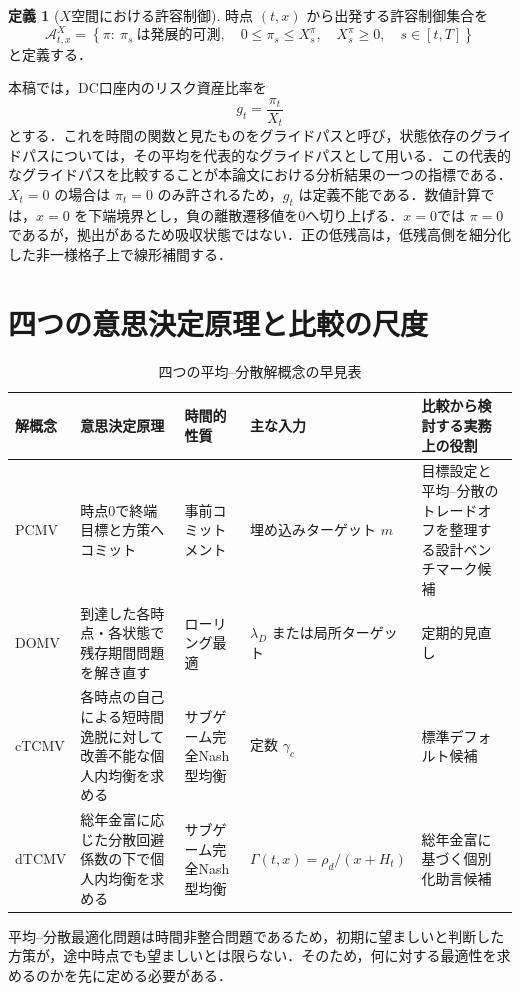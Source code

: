 \documentclass[10pt,a4paper]{article}
\theoremstyle{plain}
\theoremstyle{definition}
\newtheorem{definition}{定義}
\newcommand{\A}{\mathcal{A}}
\begin{document}
\begin{definition}[$X$空間における許容制御]
時点 $(t,x)$ から出発する許容制御集合を
\begin{equation}
  \A^X_{t,x}
  =
  \left\{
  \pi:\ \pi_s\ \text{は発展的可測},\quad
  0\leq\pi_s\leq X_s^\pi,\quad X_s^\pi\geq0,\quad s\in[t,T]
  \right\}
  \label{eq:admissible-X}
\end{equation}
と定義する．
\end{definition}

本稿では，DC口座内のリスク資産比率を
\begin{equation}
  g_t=\frac{\pi_t}{X_t}
  \label{eq:glidepath-def}
\end{equation}
とする．これを時間の関数と見たものをグライドパスと呼び，状態依存のグライドパスについては，その平均を代表的なグライドパスとして用いる．この代表的なグライドパスを比較することが本論文における分析結果の一つの指標である．$X_t=0$ の場合は $\pi_t=0$ のみ許されるため，$g_t$ は定義不能である．数値計算では，$x=0$ を下端境界とし，負の離散遷移値を0へ切り上げる．$x=0$では $\pi=0$ であるが，拠出があるため吸収状態ではない．正の低残高は，低残高側を細分化した非一様格子上で線形補間する．




\section{四つの意思決定原理と比較の尺度}\label{sec:principles-main}
\begin{table}[htbp]
\centering
\scriptsize
\caption{四つの平均--分散解概念の早見表}
\label{tab:four-concepts-guide}
\begin{tabularx}{\textwidth}{p{16mm}p{39mm}p{25mm}p{28mm}X}
\toprule
解概念 & 意思決定原理 & 時間的性質 & 主な入力 & 比較から検討する実務上の役割 \\
\midrule
PCMV & 時点0で終端目標と方策へコミット & 事前コミットメント & 埋め込みターゲット $m$ & 目標設定と平均--分散のトレードオフを整理する設計ベンチマーク候補 \\
DOMV & 到達した各時点・各状態で残存期間問題を解き直す & ローリング最適 & $\lambda_D$ または局所ターゲット & 定期的見直し \\
cTCMV & 各時点の自己による短時間逸脱に対して改善不能な個人内均衡を求める & サブゲーム完全Nash型均衡 & 定数 $\gamma_c$ & 標準デフォルト候補 \\
dTCMV & 総年金富に応じた分散回避係数の下で個人内均衡を求める & サブゲーム完全Nash型均衡 & $\Gamma(t,x)=\rho_d/(x+H_t)$ & 総年金富に基づく個別化助言候補 \\
\bottomrule
\end{tabularx}
\end{table}
平均--分散最適化問題は時間非整合問題であるため，初期に望ましいと判断した方策が，途中時点でも望ましいとは限らない．そのため，何に対する最適性を求めるのかを先に定める必要がある．
\end{document}
